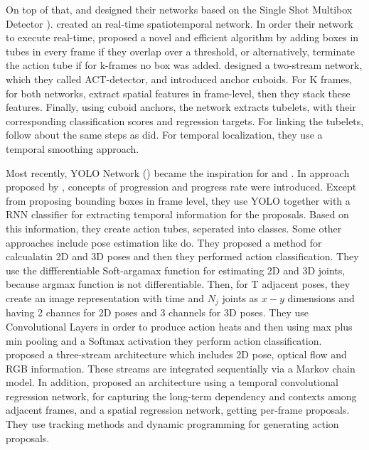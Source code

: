 On top of that, \cite{singh2016online} and \cite{kalogeiton17iccv:hal-01519812} designed their networks based on the Single Shot Multibox Detector \cite{DBLP:journals/corr/LiuAESR15}).
\cite{singh2016online} created an real-time spatiotemporal network. In order their network to execute real-time,  \cite{singh2016online} proposed a novel and efficient algorithm
by adding boxes in tubes in every frame if they overlap over a threshold, or alternatively, terminate the action tube if for k-frames no box was added.  \cite{kalogeiton17iccv:hal-01519812}
designed a two-stream network, which they called ACT-detector, and introduced anchor cuboids. For K frames, for both networks, \cite{kalogeiton17iccv:hal-01519812} extract spatial
features in frame-level, then they stack these features. Finally, using cuboid anchors, the network extracts tubelets,  with their corresponding classification
scores and regression targets. For linking the tubelets, \cite{kalogeiton17iccv:hal-01519812} follow about the same steps as \cite{singh2016online} did. For temporal localization, they use
a temporal smoothing approach. \par

Most recently, YOLO Network (\cite{DBLP:journals/corr/RedmonDGF15}) became the inspiration for \cite{DBLP:journals/corr/abs-1903-00304} and
\cite{DBLP:journals/corr/abs-1802-08362}. In approach proposed by \cite{DBLP:journals/corr/abs-1903-00304}, concepts of progression and progress
rate were introduced. Except from proposing bounding boxes in frame level, they use YOLO together with a RNN classifier for extracting temporal information for the proposals.
Based on this information, they create action tubes, seperated into classes. Some other approaches include pose estimation like \cite{DBLP:journals/corr/abs-1802-09232} do. 
They proposed a method for calcualatin 2D and 3D poses and then they performed action classification. They use the diffferentiable Soft-argamax function for estimating 2D and 3D joints, because
argmax function is not differentiable. Then, for T adjacent poses, they create an image representation with time and $N_j$ joints as $x-y$ dimensions and having 2 channes for 2D poses and 3
channels for 3D poses. They use Convolutional Layers in order to produce action heats and then using max plus min pooling and a Softmax activation they perform action classification.
\cite{DBLP:journals/corr/ZolfaghariOSB17} proposed a three-stream architecture which includes 2D pose, optical flow and RGB information. These streams are integrated sequentially via a Markov
chain model. In addition, \cite{8237881} proposed an architecture using a temporal convolutional regression network, for capturing the long-term dependency and contexts among adjacent
frames, and a spatial regression network,
getting per-frame proposals. They use tracking methods and dynamic programming for generating action proposals.\par


